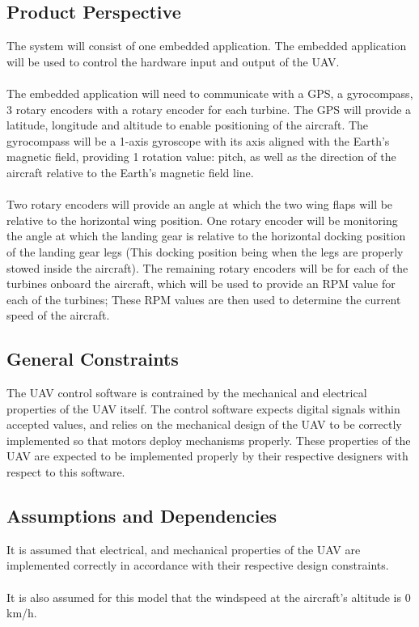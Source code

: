\documentclass[titlepage]{article}
\begin{document}
\subsection{Product Perspective}
The system will consist of one embedded application. The embedded application will be used to control the hardware input and output of the UAV.\\\\
The embedded application will need to communicate with a GPS, a gyrocompass, 3 rotary encoders with a rotary encoder for each turbine.
The GPS will provide a latitude, longitude and altitude to enable positioning of the aircraft.
The gyrocompass will be a 1-axis gyroscope with its axis aligned with the Earth's magnetic field, providing 1 rotation value: pitch, as well as the direction of the aircraft relative to the Earth's magnetic field line.\\\\
Two rotary encoders will provide an angle at which the two wing flaps will be relative to the horizontal wing position. One rotary encoder will be monitoring the angle at which the landing gear is relative to the horizontal docking position of the landing gear legs (This docking position being when the legs are properly stowed inside the aircraft). The remaining rotary encoders will be for each of the turbines onboard the aircraft, which will be used to provide an RPM value for each of the turbines; These RPM values are then used to determine the current speed of the aircraft.
 
\subsection{General Constraints}
The UAV control software is contrained by the mechanical and electrical properties of the UAV itself.
The control software expects digital signals within accepted values, and relies on the mechanical design of the UAV to be correctly implemented so that motors deploy mechanisms properly. These properties of the UAV are expected to be implemented properly by their respective designers with respect to this software.

\subsection{Assumptions and Dependencies}
It is assumed that electrical, and mechanical properties of the UAV are implemented correctly in accordance with their respective design constraints.\\\\
It is also assumed for this model that the windspeed at the aircraft's altitude is 0 km/h.
\end{document}
